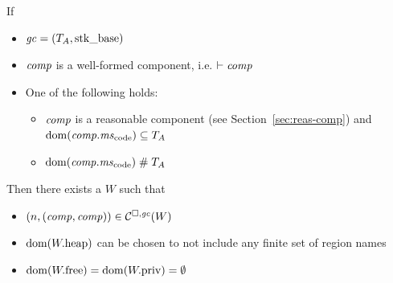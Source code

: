 \documentclass[a4paper]{article}
\begin{document}
\begin{lemma}
  If
  \begin{itemize}
  \item $\mathit{gc} = (T_{A},\mathrm{stk\_base})$
  \item $\mathit{comp}$ is a well-formed component, i.e. $\vdash \mathit{comp}$
  \item One of the following holds:
    \begin{itemize}
    \item $\mathit{comp}$ is a reasonable component (see
      Section~\ref{sec:reas-comp}) and $\dom(\var{comp}.\mscode) \subseteq \ta$
    \item $\dom(\var{comp}.\mscode) \mathrel{\#} \ta$
    \end{itemize}
  \end{itemize}
  Then there exists a $W$ such that
  \begin{itemize}
  \item $\left(n,(\mathit{comp},\mathit{comp})\right) \in \mathcal{C}^{\square,\mathit{gc}}(W)$
  \item $\mathrm{dom}(W.\mathrm{heap})$ can be chosen to not include any finite set of region names 
  \item $\mathrm{dom}(W.\mathrm{free}) =
    \mathrm{dom}(W.\mathrm{priv})=\emptyset$
  \end{itemize}
\end{lemma}
\end{document}
